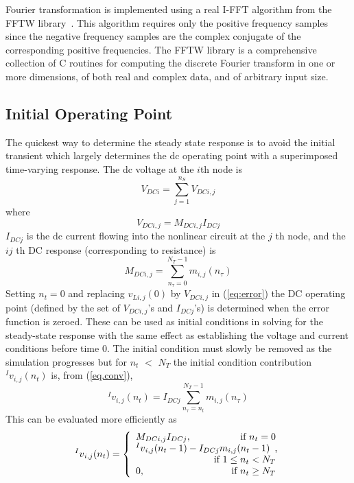 Fourier transformation is implemented using a real I-FFT algorithm
from the FFTW library~\cite{FFTW}. This algorithm requires only the
positive frequency samples since the negative frequency samples are
the complex conjugate of the corresponding positive frequencies. The
FFTW library is a comprehensive collection of C routines for computing
the discrete Fourier transform in one or more dimensions, of both real
and complex data, and of arbitrary input size.


\subsection{Initial Operating Point}

The quickest way to determine the steady state response is to avoid
the initial transient which largely determines the dc operating point
with a superimposed time-varying response. The dc voltage at the $i$th 
node is
\begin{equation}
  V_{DCi} = \sum_{j=1}^{n_S} V_{DCi,j} \label{eq.dc1}
\end{equation}
where
\begin{equation}
  V_{DCi,j} = M_{DCi,j} I_{DCj}
\end{equation}
$I_{DCj}$ is the dc current flowing into the nonlinear circuit at the
$j$ th node, and the $ij$ th DC response (corresponding to resistance)
is
\begin{equation}
  M_{DCi,j} = \sum_{n_{\tau}=0}^{N_T-1} m_{i,j}(n_{\tau})
\label{eq:mdcij}
\end{equation}
Setting $n_t = 0$ and replacing $v_{Li,j}(0)$ by $V_{DCi,j}$ in
(\ref{eq:error}) the DC operating point (defined by the set of
$V_{DCi,j}$'s and $I_{DCj}$'s) is determined when the error function
is zeroed.  These can be used as initial conditions in solving for the
steady-state response with the same effect as establishing the voltage
and current conditions before time 0.  The initial condition must
slowly be removed as the simulation progresses but for $n_t$ $<$ $N_T$
the initial condition contribution ${^Iv}_{i,j}(n_t)$ is, from
(\ref{eq.conv}),
%
\begin{equation}
  {^Iv}_{i,j}(n_t) = I_{DCj} \sum_{n_{\tau}=n_t}^{N_T-1} m_{i,j}(n_{\tau})
\end{equation}
This can be evaluated more efficiently as
\begin{equation}
  {^Iv}_{i,j}(n_t) = \left\{
  \begin{array}{lr}
    M_{DCi,j}I_{DCj}, & \mbox{if $n_t = 0$} \\
    \multicolumn{2}{l}{{^Iv}_{i,j}(n_t-1) - I_{DCj}m_{i,j}(n_t-1)},  \\
    \multicolumn{2}{r}{\mbox{if $1 \le n_t < N_T$}} \\
    0, & \mbox{if $n_t \ge N_T$} \\
\end{array}
\right.
\end{equation}
